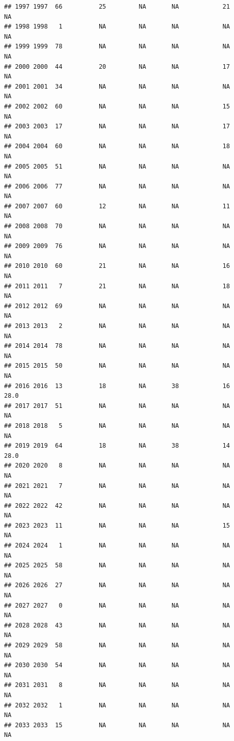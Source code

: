 \documentclass[man]{apa6}
\begin{document}
\begin{verbatim}
## 1997 1997  66          25         NA       NA            21       NA
## 1998 1998   1          NA         NA       NA            NA       NA
## 1999 1999  78          NA         NA       NA            NA       NA
## 2000 2000  44          20         NA       NA            17       NA
## 2001 2001  34          NA         NA       NA            NA       NA
## 2002 2002  60          NA         NA       NA            15       NA
## 2003 2003  17          NA         NA       NA            17       NA
## 2004 2004  60          NA         NA       NA            18       NA
## 2005 2005  51          NA         NA       NA            NA       NA
## 2006 2006  77          NA         NA       NA            NA       NA
## 2007 2007  60          12         NA       NA            11       NA
## 2008 2008  70          NA         NA       NA            NA       NA
## 2009 2009  76          NA         NA       NA            NA       NA
## 2010 2010  60          21         NA       NA            16       NA
## 2011 2011   7          21         NA       NA            18       NA
## 2012 2012  69          NA         NA       NA            NA       NA
## 2013 2013   2          NA         NA       NA            NA       NA
## 2014 2014  78          NA         NA       NA            NA       NA
## 2015 2015  50          NA         NA       NA            NA       NA
## 2016 2016  13          18         NA       38            16     28.0
## 2017 2017  51          NA         NA       NA            NA       NA
## 2018 2018   5          NA         NA       NA            NA       NA
## 2019 2019  64          18         NA       38            14     28.0
## 2020 2020   8          NA         NA       NA            NA       NA
## 2021 2021   7          NA         NA       NA            NA       NA
## 2022 2022  42          NA         NA       NA            NA       NA
## 2023 2023  11          NA         NA       NA            15       NA
## 2024 2024   1          NA         NA       NA            NA       NA
## 2025 2025  58          NA         NA       NA            NA       NA
## 2026 2026  27          NA         NA       NA            NA       NA
## 2027 2027   0          NA         NA       NA            NA       NA
## 2028 2028  43          NA         NA       NA            NA       NA
## 2029 2029  58          NA         NA       NA            NA       NA
## 2030 2030  54          NA         NA       NA            NA       NA
## 2031 2031   8          NA         NA       NA            NA       NA
## 2032 2032   1          NA         NA       NA            NA       NA
## 2033 2033  15          NA         NA       NA            NA       NA

\end{verbatim}
\end{document}
